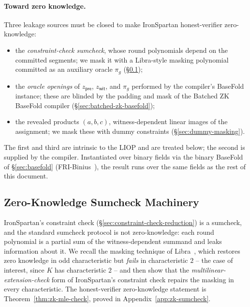 \documentclass{article}
\theoremstyle{definition}
\begin{document}
\paragraph{Toward zero knowledge.}
Three leakage sources must be closed to make IronSpartan honest-verifier zero-knowledge:
\begin{itemize}
\item the \emph{constraint-check sumcheck}, whose round polynomials depend on the committed segments; we mask it with a Libra-style masking polynomial committed as an auxiliary oracle $\pi_g$ (\S\ref{sec:zk-sumcheck-machinery});
\item the \emph{oracle openings} of $z_{\textsf{pre}}$, $z_{\textsf{wit}}$, and $\pi_g$ performed by the compiler's BaseFold instance; these are blinded by the padding and mask of the Batched ZK BaseFold compiler (\S\ref{sec:batched-zk-basefold});
\item the revealed products $(a, b, c)$, witness-dependent linear images of the assignment; we mask these with dummy constraints (\S\ref{sec:dummy-masking}).
\end{itemize}
The first and third are intrinsic to the LIOP and are treated below; the second is supplied by the compiler. Instantiated over binary fields via the binary BaseFold of \S\ref{sec:basefold} (FRI-Binius~\cite{Diamond:2025ab}), the result runs over the same fields as the rest of this document.

\subsection{Zero-Knowledge Sumcheck Machinery}
\label{sec:zk-sumcheck-machinery}

IronSpartan's constraint check (\S\ref{sec:constraint-check-reduction}) is a sumcheck, and the standard sumcheck protocol is not zero-knowledge: each round polynomial is a partial sum of the witness-dependent summand and leaks information about it. We recall the masking technique of Libra~\cite{Xie:2019aa}, which restores zero knowledge in odd characteristic but \emph{fails} in characteristic $2$ -- the case of interest, since $K$ has characteristic $2$ -- and then show that the \emph{multilinear-extension-check} form of IronSpartan's constraint check repairs the masking in every characteristic. The honest-verifier zero-knowledge statement is Theorem~\ref{thm:zk-mle-check}, proved in Appendix~\ref{app:zk-sumcheck}.
\end{document}
